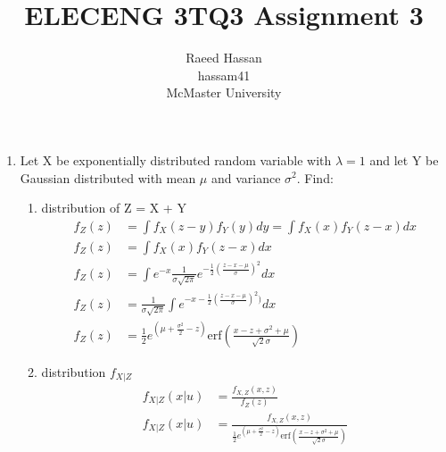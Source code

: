 \documentclass[12pt]{article}
\title{ELECENG 3TQ3 Assignment 3}
\author{Raeed Hassan \\ hassam41 \\ McMaster University}
\begin{document}
\maketitle
\pagebreak
\begin{enumerate}
    \item Let X be exponentially distributed random variable with $\lambda = 1$ and let Y be Gaussian distributed with mean $\mu$ and variance $\sigma^2$. Find:
    \begin{enumerate}
        \item distribution of Z = X + Y \\
        \begin{equation*}
        \begin{aligned}
            f_Z(z) &= \int f_X(z-y)f_Y(y) dy = \int f_X(x)f_Y(z-x) dx \\
            f_Z(z) &= \int f_X(x)f_Y(z-x) dx \\
            f_Z(z) &= \int e^{-x} \frac{1}{\sigma \sqrt{2\pi}} e^{-\frac{1}{2}(\frac{z-x-\mu}{\sigma})^2} dx \\
            f_Z(z) &= \frac{1}{\sigma\sqrt{2\pi}} \int e^{-x-\frac{1}{2}(\frac{z-x-\mu}{\sigma})^2)} dx \\
            f_Z(z) &= \frac{1}{2} e^{\left(\mu + \frac{\sigma^2}{2} - z\right)} \text{erf}\left(\frac{x-z+\sigma^2+\mu}{\sqrt{2}\sigma}\right) 
        \end{aligned}
        \end{equation*}
        \item distribution $f_{X|Z}$
        \begin{equation*}
        \begin{aligned}
            f_{X|Z}(x|u) &= \frac{f_{X,Z}(x,z)}{f_Z(z)} \\
            f_{X|Z}(x|u) &= \frac{f_{X,Z}(x,z)}{\frac{1}{2} e^{\left(\mu + \frac{\sigma^2}{2} - z\right)} \text{erf}\left(\frac{x-z+\sigma^2+\mu}{\sqrt{2}\sigma}\right)} \\
        \end{aligned}
        \end{equation*}
    \end{enumerate}
    

\end{enumerate}
\end{document}
